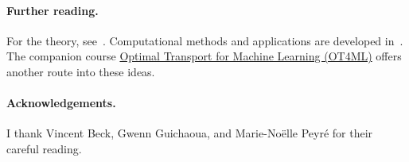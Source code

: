 \paragraph*{Further reading.}
For the theory, see~\cite{Villani03,SantambrogioBook}. Computational methods and applications are developed in~\cite{PeyreCuturi}. The companion course \href{https://www.gpeyre.com/ot4ml/}{Optimal Transport for Machine Learning (OT4ML)} offers another route into these ideas.

\ifdefined\StandaloneChapter
\paragraph*{Acknowledgements.}
I thank Vincent Beck, Gwenn Guichaoua, and Marie-Noëlle Peyré for their careful reading.
\fi
